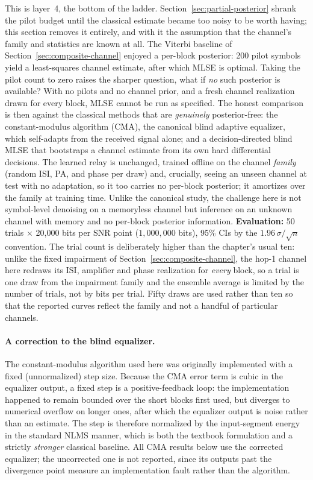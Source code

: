 This is layer~4, the bottom of the ladder. Section~\ref{sec:partial-posterior} shrank the pilot budget until the classical estimate became too noisy to be worth having; this section removes it entirely, and with it the assumption that the channel's family and statistics are known at all. The Viterbi baseline of Section~\ref{sec:composite-channel} enjoyed a per-block posterior: 200 pilot symbols yield a least-squares channel estimate, after which MLSE is optimal. Taking the pilot count to zero raises the sharper question, what if \emph{no} such posterior is available? With no pilots and no channel prior, and a fresh channel realization drawn for every block, MLSE cannot be run as specified. The honest comparison is then against the classical methods that are \emph{genuinely} posterior-free: the constant-modulus algorithm (CMA), the canonical blind adaptive equalizer, which self-adapts from the received signal alone; and a decision-directed blind MLSE that bootstraps a channel estimate from its own hard differential decisions. The learned relay is unchanged, trained offline on the channel \emph{family} (random ISI, PA, and phase per draw) and, crucially, seeing an unseen channel at test with no adaptation, so it too carries no per-block posterior; it amortizes over the family at training time. Unlike the canonical study, the challenge here is not symbol-level denoising on a memoryless channel but inference on an unknown channel with memory and no per-block posterior information. \textbf{Evaluation:} 50 trials $\times$ 20{,}000 bits per SNR point ($1{,}000{,}000$ bits), 95\% CIs by the $1.96\,\sigma/\sqrt{n}$ convention. The trial count is deliberately higher than the chapter's usual ten: unlike the fixed impairment of Section~\ref{sec:composite-channel}, the hop-1 channel here redraws its ISI, amplifier and phase realization for \emph{every} block, so a trial is one draw from the impairment family and the ensemble average is limited by the number of trials, not by bits per trial. Fifty draws are used rather than ten so that the reported curves reflect the family and not a handful of particular channels.

\paragraph{A correction to the blind equalizer.} The constant-modulus algorithm used here was originally implemented with a fixed (unnormalized) step size. Because the CMA error term is cubic in the equalizer output, a fixed step is a positive-feedback loop: the implementation happened to remain bounded over the short blocks first used, but diverges to numerical overflow on longer ones, after which the equalizer output is noise rather than an estimate. The step is therefore normalized by the input-segment energy in the standard NLMS manner, which is both the textbook formulation and a strictly \emph{stronger} classical baseline. All CMA results below use the corrected equalizer; the uncorrected one is not reported, since its outputs past the divergence point measure an implementation fault rather than the algorithm.

